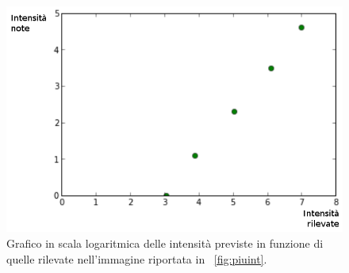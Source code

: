 \begin{figure}
 \centering
 \includegraphics[scale=.40]{img/CAP3linearita.png}
 \caption{\small{Grafico in scala logaritmica delle intensità previste in funzione di quelle rilevate nell'immagine riportata in \figurename~\ref{fig:piuint}.}}
 \label{fig:linearita}
\end{figure}


